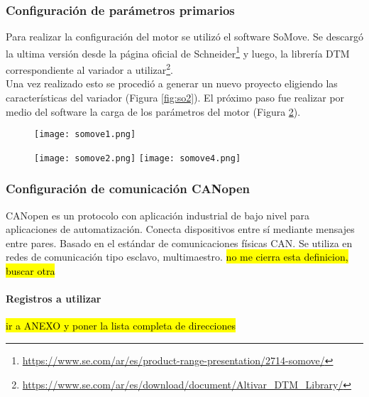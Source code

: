 \subsubsection{Configuración de parámetros primarios}
Para realizar la configuración del motor se utilizó el software SoMove. Se descargó la ultima versión desde la página oficial de Schneider\footnote{\url{https://www.se.com/ar/es/product-range-presentation/2714-somove/}} y luego, la librería DTM correspondiente al variador a utilizar\footnote{\url{https://www.se.com/ar/es/download/document/Altivar_DTM_Library/}}.
\\
Una vez realizado esto se procedió a generar un nuevo proyecto eligiendo las características del variador (Figura \ref{fig:so2}). El próximo paso fue realizar por medio del software la carga de los parámetros del motor (Figura \ref{fig:so4}).
\begin{figure}[h]
	\centering
	\texttt{[image: somove1.png]}
	\label{fig:so1}
\end{figure}	
\begin{figure}[h]
	\centering
	\texttt{[image: somove2.png]}
	\label{fig:so2}
	\texttt{[image: somove4.png]}
	\label{fig:so4}
\end{figure}

\subsubsection{Configuración de comunicación CANopen}
\begin{tcolorbox}[colback=blue!5!white,colframe=blue!75!black,title=CANopen]
	CANopen es un protocolo con aplicación industrial de bajo nivel para aplicaciones de automatización. Conecta dispositivos entre sí mediante mensajes entre pares. Basado en el estándar de comunicaciones físicas CAN. Se utiliza en redes de comunicación tipo esclavo, multimaestro. \hl{no me cierra esta definicion, buscar otra}
\end{tcolorbox}

\paragraph{Registros a utilizar}
\hl{ir a ANEXO y poner la lista completa de direcciones}

\newpage

